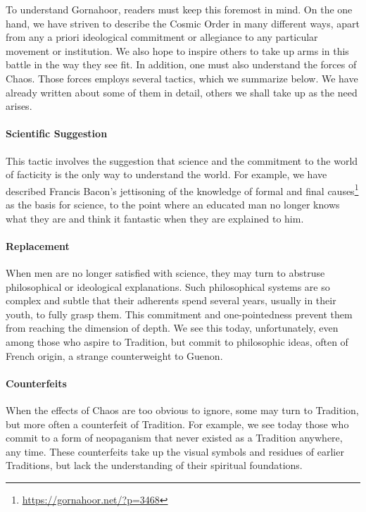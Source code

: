 To understand Gornahoor, readers must keep this foremost in mind. On the one hand, we have striven to describe the Cosmic Order in many different ways, apart from any a priori ideological commitment or allegiance to any particular movement or institution. We also hope to inspire others to take up arms in this battle in the way they see fit. In addition, one must also understand the forces of Chaos. Those forces employs several tactics, which we summarize below. We have already written about some of them in detail, others we shall take up as the need arises.

\paragraph{Scientific Suggestion}


This tactic involves the suggestion that science and the commitment to the world of facticity is the only way to understand the world. For example, we have described Francis Bacon's jettisoning of the knowledge of formal and final causes\footnote{\url{https://gornahoor.net/?p=3468}} as the basis for science, to the point where an educated man no longer knows what they are and think it fantastic when they are explained to him.

\paragraph{Replacement}


When men are no longer satisfied with science, they may turn to abstruse philosophical or ideological explanations. Such philosophical systems are so complex and subtle that their adherents spend several years, usually in their youth, to fully grasp them. This commitment and one-pointedness prevent them from reaching the dimension of depth. We see this today, unfortunately, even among those who aspire to Tradition, but commit to philosophic ideas, often of French origin, a strange counterweight to Guenon.

\paragraph{Counterfeits}


When the effects of Chaos are too obvious to ignore, some may turn to Tradition, but more often a counterfeit of Tradition. For example, we see today those who commit to a form of neopaganism that never existed as a Tradition anywhere, any time. These counterfeits take up the visual symbols and residues of earlier Traditions, but lack the understanding of their spiritual foundations.

